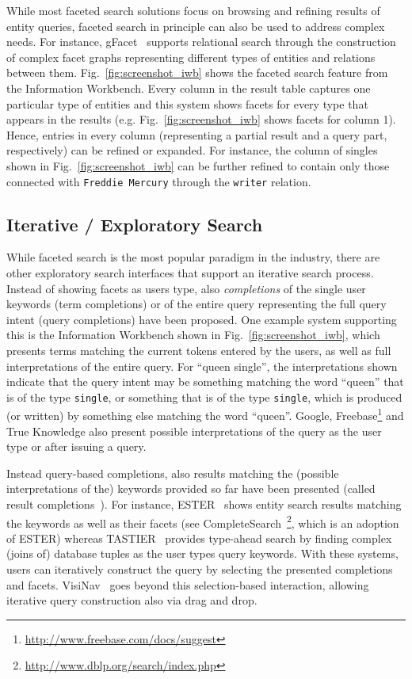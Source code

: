 While most faceted search solutions focus on browsing and refining results of entity queries, faceted search in principle can also be used to address complex needs. For instance, gFacet~\cite{DBLP:conf/esws/HeimEZ10} supports relational search through the construction of complex facet graphs representing different types of entities and relations between them. Fig.~\ref{fig:screenshot_iwb} shows the faceted search feature from the Information Workbench. Every column in the result table captures one particular type of entities and this system shows facets for every type that appears in the results (e.g. Fig.~\ref{fig:screenshot_iwb} shows facets for column 1). Hence, entries in every column (representing a partial result and a query part, respectively) can be refined or expanded. For instance, the column of singles shown in Fig.~\ref{fig:screenshot_iwb} can be further refined to contain only those connected with \verb+Freddie Mercury+ through the \verb+writer+ relation. 

\subsection{Iterative / Exploratory Search} 
While faceted search is the most popular paradigm in the industry, there are other exploratory search interfaces that support an iterative search process. Instead of showing facets as users type, also \emph{completions} of the single user keywords (term completions) or of the entire query representing the full query intent (query completions) have been proposed. One example system supporting this is the Information Workbench shown in Fig.~\ref{fig:screenshot_iwb}, which presents terms matching the current tokens entered by the users, as well as full interpretations of the entire query. For ``queen single'', the interpretations shown indicate that the query intent may be something matching the word ``queen'' that is of the type \verb+single+, or something that is of the type \verb+single+, which is produced (or written) by something else matching the word ``queen''. Google, Freebase\footnote{\url{http://www.freebase.com/docs/suggest}} and True Knowledge also present possible interpretations of the query as the user type or after issuing a query. 

Instead query-based completions, also results matching the (possible interpretations of the) keywords provided so far have been presented (called result completions~\cite{DBLP:conf/esws/TranMH10}). For instance, ESTER~\cite{DBLP:conf/sigir/BastCSW07} shows entity search results matching the keywords as well as their facets (see CompleteSearch~\footnote{\url{http://www.dblp.org/search/index.php}}, which is an adoption of ESTER) whereas TASTIER~\cite{DBLP:conf/sigmod/LiJLF09} provides type-ahead search by finding complex (joins of) database tuples as the user types query keywords. With these systems, users can iteratively construct the query by selecting the presented completions and facets. VisiNav~\cite{DBLP:journals/ws/Harth10} goes beyond this selection-based interaction, allowing iterative query construction also via drag and drop. 	
	
